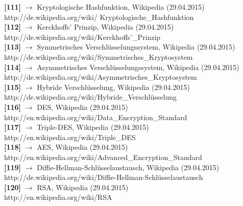 \documentclass[12pt,a4paper]{report}
\begin{document}
\begin{onehalfspace}
\noindent
\textbf{[111]} $\rightarrow$ Kryptologische Hashfunktion, Wikipedia (29.04.2015)\\
http://de.wikipedia.org/wiki/ Kryptologische\_Hashfunktion\\

\noindent
\textbf{[112]} $\rightarrow$ Kerckhoffs' Prinzip, Wikipedia (29.04.2015)\\
http://de.wikipedia.org/wiki/Kerckhoffs'\_Prinzip\\

\noindent
\textbf{[113]} $\rightarrow$ Symmetrisches Verschlüsselungssystem, Wikipedia (29.04.2015)\\
http://de.wikipedia.org/wiki/Symmetrisches\_Kryptosystem\\

\noindent
\textbf{[114]} $\rightarrow$ Asymmetrisches Verschlüsselungssystem, Wikipedia (29.04.2015)\\
http://de.wikipedia.org/wiki/Asymmetrisches\_Kryptosystem\\

\noindent
\textbf{[115]} $\rightarrow$ Hybride Verschlüsselung, Wikipedia (29.04.2015)\\
http://de.wikipedia.org/wiki/Hybride\_Verschlüsselung\\

\noindent
\textbf{[116]} $\rightarrow$ DES, Wikipedia (29.04.2015)\\
http://en.wikipedia.org/wiki/Data\_Encryption\_Standard\\

\noindent
\textbf{[117]} $\rightarrow$ Triple-DES, Wikipedia (29.04.2015)\\
http://en.wikipedia.org/wiki/Triple\_DES\\

\noindent
\textbf{[118]} $\rightarrow$ AES, Wikipedia (29.04.2015)\\
http://en.wikipedia.org/wiki/Advanced\_Encryption\_Standard\\

\noindent
\textbf{[119]} $\rightarrow$ Diffie-Hellman-Schlüsselaustausch, Wikipedia (29.04.2015)\\
http://de.wikipedia.org/wiki/Diffie-Hellman-Schlüsselaustausch\\

\noindent
\textbf{[120]} $\rightarrow$ RSA, Wikipedia (29.04.2015)\\
http://en.wikipedia.org/wiki/RSA\\


\end{onehalfspace}
\end{document}
